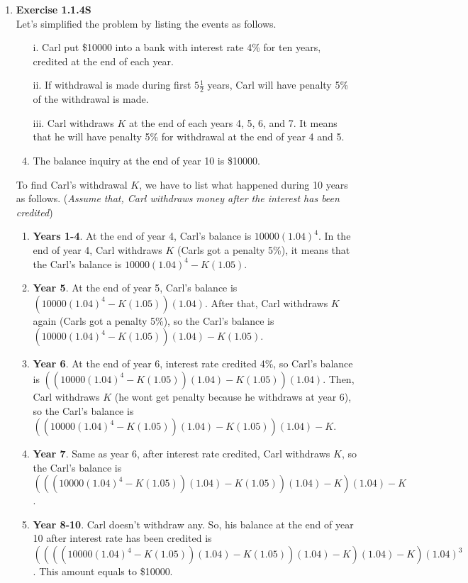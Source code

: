 \documentclass{article}
\begin{document}
\begin{enumerate}
		\pagebreak
		\item \textbf{Exercise 1.1.4S}\\
		Let's simplified the problem by listing the events as follows.
		\begin{enumerate}
			\item[i.] Carl put \$10000 into a bank with interest rate 4\% for ten years, credited at the end of each year.
			\item[ii.] If withdrawal is made during first $5\frac{1}{2}$ years, Carl will have penalty 5\% of the withdrawal is made.
			\item[iii.] Carl withdraws $K$ at the end of each years 4, 5, 6, and 7. It means that he will have penalty 5\% for withdrawal at the end of year 4 and 5.
			\item The balance inquiry at the end of year 10 is \$10000.
		\end{enumerate}
		To find Carl's withdrawal $K$, we have to list what happened during 10 years as follows. (\textit{Assume that, Carl withdraws money after the interest has been credited})
		\begin{enumerate}
			\item \textbf{Years 1-4}. At the end of year 4, Carl's balance is $10000(1.04)^4$. In the end of year 4, Carl withdraws $K$ (Carls got a penalty 5\%), it means that the Carl's balance is $10000(1.04)^4-K(1.05)$.
			\item \textbf{Year 5}. At the end of year 5, Carl's balance is $(10000(1.04)^4-K(1.05))(1.04)$. After that, Carl withdraws $K$ again (Carls got a penalty 5\%), so the Carl's balance is $(10000(1.04)^4-K(1.05))(1.04)-K(1.05)$.
			\item \textbf{Year 6}. At the end of year 6, interest rate credited 4\%, so Carl's balance is $((10000(1.04)^4-K(1.05))(1.04)-K(1.05))(1.04)$. Then, Carl withdraws $K$ (he wont get penalty because he withdraws at year 6), so the Carl's balance is $((10000(1.04)^4-K(1.05))(1.04)-K(1.05))(1.04)-K$.
			\item \textbf{Year 7}. Same as year 6, after interest rate credited, Carl withdraws $K$, so the Carl's balance is $(((10000(1.04)^4-K(1.05))(1.04)-K(1.05))(1.04)-K)(1.04)-K$.
			\item \textbf{Year 8-10}. Carl doesn't withdraw any. So, his balance at the end of year 10 after interest rate has been credited is $((((10000(1.04)^4-K(1.05))(1.04)-K(1.05))(1.04)-K)(1.04)-K)(1.04)^3$. This amount equals to \$10000.
		\end{enumerate}
		

\end{enumerate}
\end{document}
